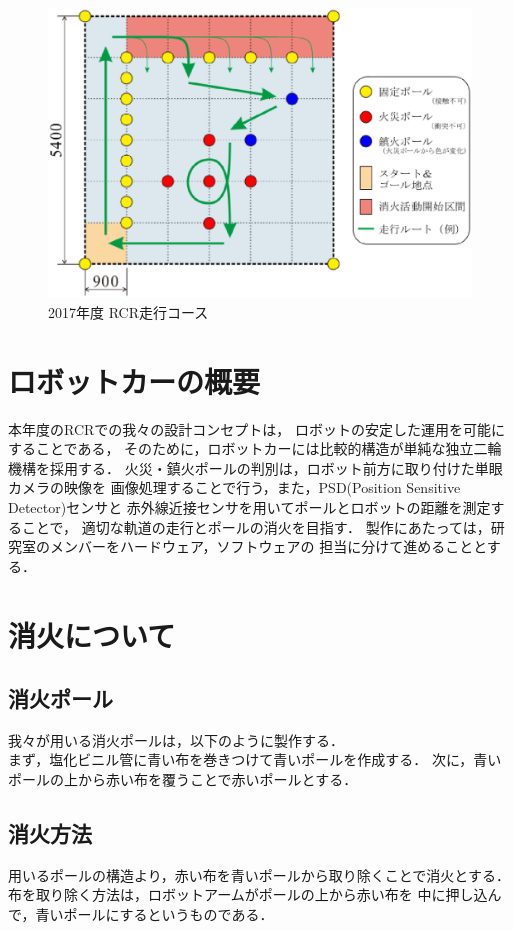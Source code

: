 \documentclass[10pt,a4j]{jarticle}
\begin{document}
\begin{figure}[t]
  \begin{center}
    \includegraphics[width=1.0\hsize]{picture/course.eps}
    \caption{2017年度 RCR走行コース}
    \label{course}
  \end{center}
\end{figure}


\newpage
\section{ロボットカーの概要}
本年度のRCRでの我々の設計コンセプトは，
ロボットの安定した運用を可能にすることである，
そのために，ロボットカーには比較的構造が単純な独立二輪機構を採用する．
火災・鎮火ポールの判別は，ロボット前方に取り付けた単眼カメラの映像を
画像処理することで行う，また，PSD(Position Sensitive Detector)センサと
赤外線近接センサを用いてポールとロボットの距離を測定することで，
適切な軌道の走行とポールの消火を目指す．
製作にあたっては，研究室のメンバーをハードウェア，ソフトウェアの
担当に分けて進めることとする．


\section{消火について}
\subsection{消火ポール}
我々が用いる消火ポールは，以下のように製作する．\\
まず，塩化ビニル管に青い布を巻きつけて青いポールを作成する．
次に，青いポールの上から赤い布を覆うことで赤いポールとする．


\subsection{消火方法}
用いるポールの構造より，赤い布を青いポールから取り除くことで消火とする．
布を取り除く方法は，ロボットアームがポールの上から赤い布を
中に押し込んで，青いポールにするというものである．
\end{document}
